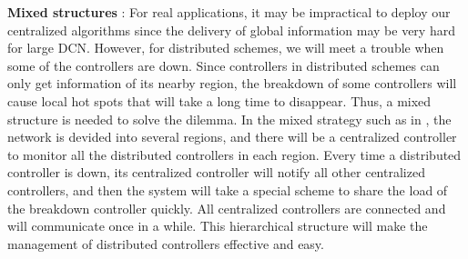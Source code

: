\textbf{Mixed structures} : For real applications, it may be impractical to deploy our centralized algorithms since the delivery of global information may be very hard for large DCN. However, for distributed schemes, we will meet a trouble when some of the controllers are down. Since controllers in distributed schemes can only get information of its nearby region, the breakdown of some controllers will cause local hot spots that will take a long time to disappear. Thus, a mixed structure is needed to solve the dilemma. In the mixed strategy such as in \cite{kandoo}, the network is devided into several regions, and there will be a centralized controller to monitor all the distributed controllers in each region. Every time a distributed controller is down, its centralized controller will notify all other centralized controllers, and then the system will take a special scheme to share the load of the breakdown controller quickly. All centralized controllers are connected and will communicate once in a while. This hierarchical structure will make the management of distributed controllers effective and easy.
